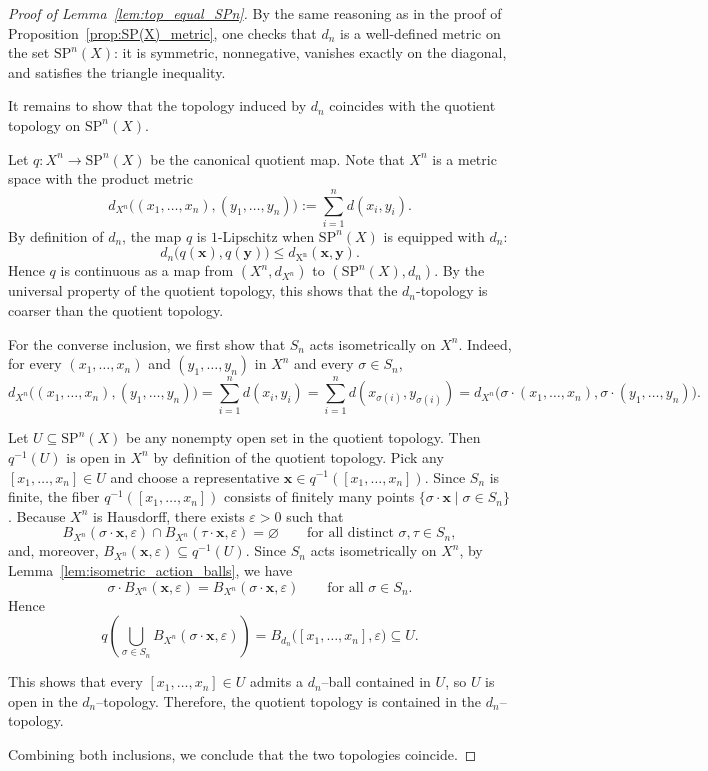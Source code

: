 \documentclass[10pt,a4paper]{article}
\theoremstyle{definition}
\newcommand{\SP}{\mathrm{SP}}
\begin{document}
\begin{proof}[Proof of Lemma~\ref{lem:top_equal_SPn}]
By the same reasoning as in the proof of Proposition~\ref{prop:SP(X)_metric},
one checks that $d_n$ is a well-defined metric on the set $\SP^{n}(X)$:
it is symmetric, nonnegative, vanishes exactly on the diagonal, and satisfies
the triangle inequality.

It remains to show that the topology induced by $d_n$ coincides with the
quotient topology on $\SP^{n}(X)$.

Let $q \colon X^{n} \to \SP^{n}(X)$ be the canonical quotient map. Note that
$X^{n}$ is a metric space with the product metric
\[
d_{X^n}\bigl((x_1,\dots,x_n),(y_1,\dots,y_n)\bigr)
:= \sum_{i=1}^{n} d(x_i,y_i).
\]
By definition of $d_n$, the map
$q$ is $1$-Lipschitz when $\SP^{n}(X)$ is equipped with $d_n$:
\[
d_n\!\bigl(q(\mathbf{x}),q(\mathbf{y})\bigr)
\le d_{\mathrm{X^n}}(\mathbf{x},\mathbf{y}).
\]
Hence $q$ is continuous as a map from $(X^{n},d_{X^n})$ to
$(\SP^{n}(X),d_{n})$. By the universal property of the quotient topology,
this shows that the $d_n$-topology is coarser than the quotient topology.

For the converse inclusion, we first show that $S_n$ acts isometrically on $X^n$.
Indeed, for every $(x_1,\ldots,x_n)$ and $(y_1,\ldots,y_n)$ in $X^n$ and every
$\sigma \in S_n$,
\[
d_{X^n}\bigl((x_1,\ldots,x_n),(y_1,\ldots,y_n)\bigr)
= \sum_{i=1}^{n} d(x_i,y_i)
= \sum_{i=1}^{n} d(x_{\sigma(i)},y_{\sigma(i)})
= d_{X^n}\bigl(\sigma\cdot(x_1,\ldots,x_n),\sigma\cdot(y_1,\ldots,y_n)\bigr).
\]

Let $U \subseteq \SP^{n}(X)$ be any nonempty open set in the quotient topology.
Then $q^{-1}(U)$ is open in $X^{n}$ by definition of the quotient topology.
Pick any $[x_1,\dots,x_n] \in U$ and choose a representative
$\mathbf{x} \in q^{-1}([x_1,\dots,x_n])$. Since $S_n$ is finite, the fiber
$q^{-1}([x_1,\dots,x_n])$ consists of finitely many points
$\{\sigma \cdot \mathbf{x} \mid \sigma \in S_n\}$.
Because $X^n$ is Hausdorff, there exists $\varepsilon>0$ such that
\[
B_{X^n}(\sigma\cdot\mathbf{x},\varepsilon)
\cap
B_{X^n}(\tau\cdot\mathbf{x},\varepsilon)
=\varnothing
\qquad
\text{for all distinct }\sigma,\tau\in S_n,
\]
and, moreover, $B_{X^n}(\mathbf{x},\varepsilon)\subseteq q^{-1}(U)$.
Since $S_n$ acts isometrically on $X^n$, by Lemma~\ref{lem:isometric_action_balls}, we have
\[
\sigma \cdot B_{X^n}(\mathbf{x},\varepsilon)
= B_{X^n}(\sigma\cdot\mathbf{x},\varepsilon)
\qquad\text{for all }\sigma \in S_n.
\]
Hence
\[
q\!\left(\bigcup_{\sigma \in S_n} B_{X^n}(\sigma\cdot\mathbf{x},\varepsilon)\right)
= B_{d_n}\bigl([x_1,\dots,x_n],\varepsilon\bigr)
\subseteq U.
\]

This shows that every $[x_1,\dots,x_n] \in U$ admits a $d_n$–ball contained in
$U$, so $U$ is open in the $d_n$–topology. Therefore, the quotient topology is
contained in the $d_n$–topology.

Combining both inclusions, we conclude that the two topologies coincide.
\end{proof}
\end{document}
